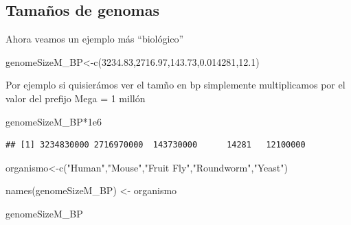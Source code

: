 \documentclass[
]{book}
\newenvironment{Shaded}{\begin{snugshade}}{\end{snugshade}}
\newcommand{\FloatTok}[1]{\textcolor[rgb]{0.00,0.00,0.81}{#1}}
\newcommand{\FunctionTok}[1]{\textcolor[rgb]{0.00,0.00,0.00}{#1}}
\newcommand{\NormalTok}[1]{#1}
\newcommand{\OtherTok}[1]{\textcolor[rgb]{0.56,0.35,0.01}{#1}}
\newcommand{\SpecialCharTok}[1]{\textcolor[rgb]{0.00,0.00,0.00}{#1}}
\newcommand{\StringTok}[1]{\textcolor[rgb]{0.31,0.60,0.02}{#1}}
\begin{document}
\hypertarget{tamauxf1os-de-genomas}{%
\subsection{Tamaños de genomas}\label{tamauxf1os-de-genomas}}

Ahora veamos un ejemplo más ``biológico''

\begin{Shaded}
\begin{Highlighting}[]
\NormalTok{genomeSizeM\_BP}\OtherTok{\textless{}{-}}\FunctionTok{c}\NormalTok{(}\FloatTok{3234.83}\NormalTok{,}\FloatTok{2716.97}\NormalTok{,}\FloatTok{143.73}\NormalTok{,}\FloatTok{0.014281}\NormalTok{,}\FloatTok{12.1}\NormalTok{)}
\end{Highlighting}
\end{Shaded}

Por ejemplo si quisierámos ver el tamño en bp simplemente multiplicamos por el valor del prefijo Mega = 1 millón

\begin{Shaded}
\begin{Highlighting}[]
\NormalTok{genomeSizeM\_BP}\SpecialCharTok{*}\FloatTok{1e6}
\end{Highlighting}
\end{Shaded}

\begin{verbatim}
## [1] 3234830000 2716970000  143730000      14281   12100000
\end{verbatim}

\begin{Shaded}
\begin{Highlighting}[]
\NormalTok{organismo}\OtherTok{\textless{}{-}}\FunctionTok{c}\NormalTok{(}\StringTok{"Human"}\NormalTok{,}\StringTok{"Mouse"}\NormalTok{,}\StringTok{"Fruit Fly"}\NormalTok{,}\StringTok{"Roundworm"}\NormalTok{,}\StringTok{"Yeast"}\NormalTok{)}
\end{Highlighting}
\end{Shaded}

\begin{Shaded}
\begin{Highlighting}[]
\FunctionTok{names}\NormalTok{(genomeSizeM\_BP) }\OtherTok{\textless{}{-}}\NormalTok{ organismo}
\end{Highlighting}
\end{Shaded}

\begin{Shaded}
\begin{Highlighting}[]
\NormalTok{genomeSizeM\_BP}
\end{Highlighting}
\end{Shaded}
\end{document}
